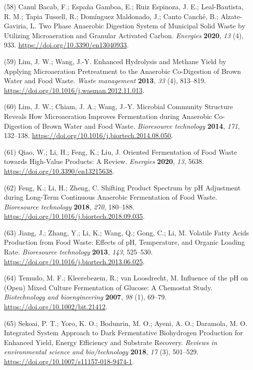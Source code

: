 \documentclass[11pt]{report}
\begin{document}
\hypertarget{citeproc_bib_item_58}{(58) Canul Bacab, F.; España Gamboa, E.; Ruiz Espinoza, J. E.; Leal-Bautista, R. M.; Tapia Tussell, R.; Domínguez Maldonado, J.; Canto Canché, B.; Alzate-Gaviria, L. Two Phase Anaerobic Digestion System of Municipal Solid Waste by Utilizing Microaeration and Granular Activated Carbon. \textit{Energies} \textbf{2020}, \textit{13} (4), 933. \url{https://doi.org/10.3390/en13040933}.}

\hypertarget{citeproc_bib_item_59}{(59) Lim, J. W.; Wang, J.-Y. Enhanced Hydrolysis and Methane Yield by Applying Microaeration Pretreatment to the Anaerobic Co-Digestion of Brown Water and Food Waste. \textit{Waste management} \textbf{2013}, \textit{33} (4), 813–819. \url{https://doi.org/10.1016/j.wasman.2012.11.013}.}

\hypertarget{citeproc_bib_item_60}{(60) Lim, J. W.; Chiam, J. A.; Wang, J.-Y. Microbial Community Structure Reveals How Microaeration Improves Fermentation during Anaerobic Co-Digestion of Brown Water and Food Waste. \textit{Bioresource technology} \textbf{2014}, \textit{171}, 132–138. \url{https://doi.org/10.1016/j.biortech.2014.08.050}.}

\hypertarget{citeproc_bib_item_61}{(61) Qiao, W.; Li, H.; Feng, K.; Liu, J. Oriented Fermentation of Food Waste towards High-Value Products: A Review. \textit{Energies} \textbf{2020}, \textit{13}, 5638. \url{https://doi.org/10.3390/en13215638}.}

\hypertarget{citeproc_bib_item_62}{(62) Feng, K.; Li, H.; Zheng, C. Shifting Product Spectrum by pH Adjustment during Long-Term Continuous Anaerobic Fermentation of Food Waste. \textit{Bioresource technology} \textbf{2018}, \textit{270}, 180–188. \url{https://doi.org/10.1016/j.biortech.2018.09.035}.}

\hypertarget{citeproc_bib_item_63}{(63) Jiang, J.; Zhang, Y.; Li, K.; Wang, Q.; Gong, C.; Li, M. Volatile Fatty Acids Production from Food Waste: Effects of pH, Temperature, and Organic Loading Rate. \textit{Bioresource technology} \textbf{2013}, \textit{143}, 525–530. \url{https://doi.org/10.1016/j.biortech.2013.06.025}.}

\hypertarget{citeproc_bib_item_64}{(64) Temudo, M. F.; Kleerebezem, R.; van Loosdrecht, M. Influence of the pH on (Open) Mixed Culture Fermentation of Glucose: A Chemostat Study. \textit{Biotechnology and bioengineering} \textbf{2007}, \textit{98} (1), 69–79. \url{https://doi.org/10.1002/bit.21412}.}

\hypertarget{citeproc_bib_item_65}{(65) Sekoai, P. T.; Yoro, K. O.; Bodunrin, M. O.; Ayeni, A. O.; Daramola, M. O. Integrated System Approach to Dark Fermentative Biohydrogen Production for Enhanced Yield, Energy Efficiency and Substrate Recovery. \textit{Reviews in environmental science and bio/technology} \textbf{2018}, \textit{17} (3), 501–529. \url{https://doi.org/10.1007/s11157-018-9474-1}.}
\end{document}
